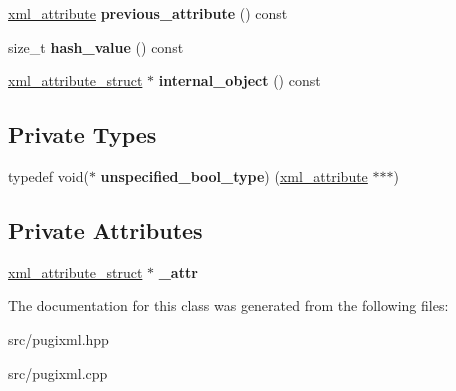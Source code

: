 \begin{DoxyCompactItemize}
\hyperlink{classpugi_1_1xml__attribute}{xml\+\_\+attribute} {\bfseries previous\+\_\+attribute} () const
\item 
\mbox{\label{classpugi_1_1xml__attribute_a6ee5731a1ced72997821236a1c957281}} 
size\+\_\+t {\bfseries hash\+\_\+value} () const
\item 
\mbox{\label{classpugi_1_1xml__attribute_afb3c9c31c506e2e8bcaed4db5233fd68}} 
\hyperlink{structpugi_1_1xml__attribute__struct}{xml\+\_\+attribute\+\_\+struct} $\ast$ {\bfseries internal\+\_\+object} () const
\end{DoxyCompactItemize}
\subsection*{Private Types}
\begin{DoxyCompactItemize}
\item 
\mbox{\label{classpugi_1_1xml__attribute_ad6a163524203e953c3fb33d2b4eb777a}} 
typedef void($\ast$ {\bfseries unspecified\+\_\+bool\+\_\+type}) (\hyperlink{classpugi_1_1xml__attribute}{xml\+\_\+attribute} $\ast$$\ast$$\ast$)
\end{DoxyCompactItemize}
\subsection*{Private Attributes}
\begin{DoxyCompactItemize}
\item 
\mbox{\label{classpugi_1_1xml__attribute_aaec2a777ec4d75042f07b44eb6429ddd}} 
\hyperlink{structpugi_1_1xml__attribute__struct}{xml\+\_\+attribute\+\_\+struct} $\ast$ {\bfseries \+\_\+attr}
\end{DoxyCompactItemize}


The documentation for this class was generated from the following files\+:\begin{DoxyCompactItemize}
\item 
src/pugixml.\+hpp\item 
src/pugixml.\+cpp\end{DoxyCompactItemize}
